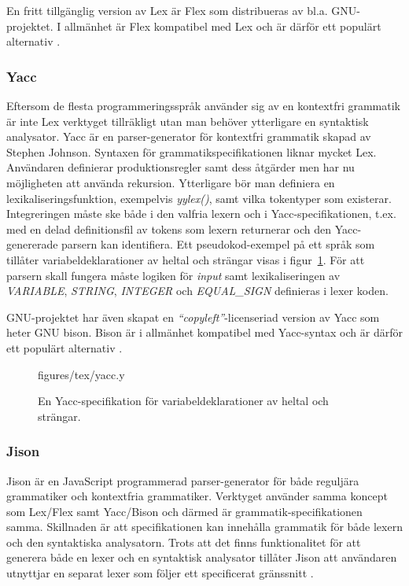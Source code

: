 En fritt tillgänglig version av Lex är Flex som distribueras av bl.a.
GNU-projektet. I allmänhet är Flex kompatibel med Lex och är därför ett
populärt alternativ \citep[s. 279]{bd92}.

\subsubsection{Yacc}

Eftersom de flesta programmeringsspråk använder sig av en kontextfri grammatik
är inte Lex verktyget tillräkligt utan man behöver ytterligare en syntaktisk
analysator. Yacc är en parser-generator för kontextfri grammatik skapad av
Stephen Johnson. Syntaxen för grammatikspecifikationen liknar mycket Lex.
Användaren definierar produktionsregler samt dess åtgärder men har nu
möjligheten att använda rekursion. Ytterligare bör man definiera en
lexikaliseringsfunktion, exempelvis \textit{yylex()}, samt vilka tokentyper
som existerar. Integreringen måste ske både i den valfria lexern och i
Yacc-specifikationen, t.ex. med en delad definitionsfil av tokens som lexern
returnerar och den Yacc-genererade parsern kan identifiera. Ett
pseudokod-exempel på ett språk som tillåter variabeldeklarationer av heltal
och strängar visas i figur~\ref{fig:yacc}. För att parsern skall fungera
måste logiken för \textit{input} samt lexikaliseringen av \textit{VARIABLE},
\textit{STRING}, \textit{INTEGER} och \textit{EQUAL_SIGN} definieras i lexer
koden.

GNU-projektet har även skapat en \textit{``copyleft''}-licenseriad version av Yacc som
heter GNU bison. Bison är i allmänhet kompatibel med Yacc-syntax och är därför
ett populärt alternativ \citep[s. 277]{bd92}.

\begin{figure}[ht]
    {figures/tex/yacc.y}
  \caption{En Yacc-specifikation för variabeldeklarationer av heltal och
    strängar.}
  \label{fig:yacc}
\end{figure}

\subsubsection{Jison}

Jison är en JavaScript programmerad parser-generator för både reguljära grammatiker
och kontextfria grammatiker. Verktyget använder samma koncept som Lex/Flex
samt Yacc/Bison och därmed är grammatik-specifikationen samma. Skillnaden är
att specifikationen kan innehålla grammatik för både lexern och den
syntaktiska analysatorn. Trots att det finns funktionalitet för att generera
både en lexer och en syntaktisk analysator tillåter Jison att användaren
utnyttjar en separat lexer som följer ett specificerat gränssnitt
\citep{jison}.

